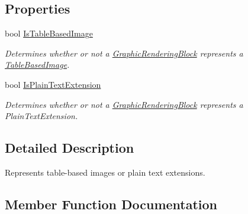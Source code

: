 \subsection*{Properties}
\begin{DoxyCompactItemize}
\item 
bool \hyperlink{classvcvj_1_1_models_1_1_grammatical___components_1_1_graphic_rendering_block_a66ec3f983a1b11b333449336afe4e1e0}{Is\+Table\+Based\+Image}
\begin{DoxyCompactList}\small\item\em Determines whether or not a \hyperlink{classvcvj_1_1_models_1_1_grammatical___components_1_1_graphic_rendering_block}{Graphic\+Rendering\+Block} represents a \hyperlink{classvcvj_1_1_models_1_1_grammatical___components_1_1_table_based_image}{Table\+Based\+Image}. \end{DoxyCompactList}\item 
bool \hyperlink{classvcvj_1_1_models_1_1_grammatical___components_1_1_graphic_rendering_block_ad59385e1e9d5ac39a87211436ff0304a}{Is\+Plain\+Text\+Extension}
\begin{DoxyCompactList}\small\item\em Determines whether or not a \hyperlink{classvcvj_1_1_models_1_1_grammatical___components_1_1_graphic_rendering_block}{Graphic\+Rendering\+Block} represents a Plain\+Text\+Extension. \end{DoxyCompactList}\end{DoxyCompactItemize}


\subsection{Detailed Description}
Represents table-\/based images or plain text extensions. 



\subsection{Member Function Documentation}
